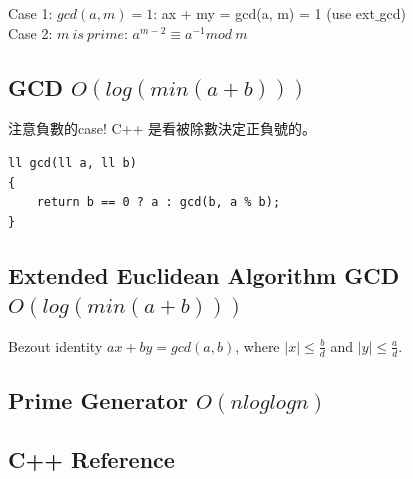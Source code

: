 \documentclass[10pt,oneside]{article}
\begin{document}
\begin{landscape}
\begin{multicols}{2}
{\normalsize 
Case 1: $gcd(a, m) = 1$:  ax + my = gcd(a, m) = 1 (use ext$\_$gcd) \\

\noindent Case 2: $m\ is\ prime$: $a^{m - 2} \equiv a^{-1} mod\ m$ 
}

\subsection{GCD $O(log( min(a + b) ))$}

{\large 注意負數的case! C++ 是看被除數決定正負號的。}

\begin{verbatim}
ll gcd(ll a, ll b)
{
    return b == 0 ? a : gcd(b, a % b);
}
\end{verbatim}

\subsection{Extended Euclidean Algorithm GCD $O(log( min(a + b) ))$}

{\normalsize 
Bezout identity $ax + by = gcd(a, b)$, where $\mid x \mid \leq \frac b d$ and $\mid y \mid \leq \frac a d$.
}


\subsection{Prime Generator $ O(n loglogn) $}

\subsection{C++ Reference}






\end{multicols}
\end{landscape}
\end{document}
